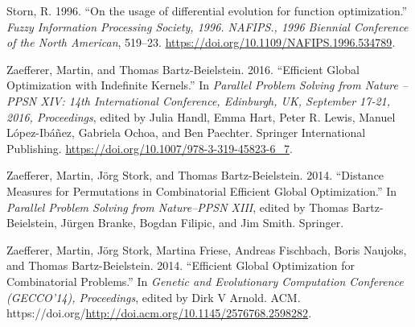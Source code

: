 \documentclass[
  twocolumn]{article}
\newlength{\cslhangindent}
\newenvironment{CSLReferences}[2] %
 {\begin{list}{}{%
  \setlength{\itemindent}{0pt}
  \setlength{\leftmargin}{0pt}
  \setlength{\parsep}{0pt}
  \ifodd #1
   \setlength{\leftmargin}{\cslhangindent}
   \setlength{\itemindent}{-1\cslhangindent}
  \fi
  \setlength{\itemsep}{#2\baselineskip}}}
 {\end{list}}
\begin{document}
\begin{CSLReferences}{1}{1}
Storn, R. 1996. {``{On the usage of differential evolution for function
optimization}.''} \emph{Fuzzy Information Processing Society, 1996.
NAFIPS., 1996 Biennial Conference of the North American}, 519--23.
\url{https://doi.org/10.1109/NAFIPS.1996.534789}.

Zaefferer, Martin, and Thomas Bartz-Beielstein. 2016. {``Efficient
Global Optimization with Indefinite Kernels.''} In \emph{Parallel
Problem Solving from Nature -- PPSN XIV: 14th International Conference,
Edinburgh, UK, September 17-21, 2016, Proceedings}, edited by Julia
Handl, Emma Hart, Peter R. Lewis, Manuel López-Ibáñez, Gabriela Ochoa,
and Ben Paechter. Springer International Publishing.
\url{https://doi.org/10.1007/978-3-319-45823-6_7}.

Zaefferer, Martin, Jörg Stork, and Thomas Bartz-Beielstein. 2014.
{``{Distance Measures for Permutations in Combinatorial Efficient Global
Optimization}.''} In \emph{Parallel Problem Solving from Nature--PPSN
XIII}, edited by Thomas Bartz-Beielstein, Jürgen Branke, Bogdan Filipic,
and Jim Smith. Springer.

Zaefferer, Martin, Jörg Stork, Martina Friese, Andreas Fischbach, Boris
Naujoks, and Thomas Bartz-Beielstein. 2014. {``{Efficient Global
Optimization for Combinatorial Problems}.''} In \emph{Genetic and
Evolutionary Computation Conference (GECCO'14), Proceedings}, edited by
Dirk V Arnold. ACM.
https://doi.org/\url{http://doi.acm.org/10.1145/2576768.2598282}.

\end{CSLReferences}
\end{document}
